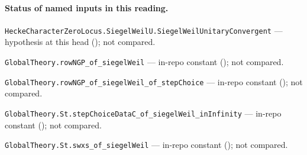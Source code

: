 

\paragraph{Status of named inputs in this reading.}
\noindent\nolinkurl{HeckeCharacterZeroLocus.SiegelWeilU.SiegelWeilUnitaryConvergent} --- hypothesis at this head (); not compared.\par
\noindent\nolinkurl{GlobalTheory.rowNGP_of_siegelWeil} --- in-repo constant (); not compared.\par
\noindent\nolinkurl{GlobalTheory.rowNGP_of_siegelWeil_of_stepChoice} --- in-repo constant (); not compared.\par
\noindent\nolinkurl{GlobalTheory.St.stepChoiceDataC_of_siegelWeil_inInfinity} --- in-repo constant (); not compared.\par
\noindent\nolinkurl{GlobalTheory.St.swxs_of_siegelWeil} --- in-repo constant (); not compared.\par

